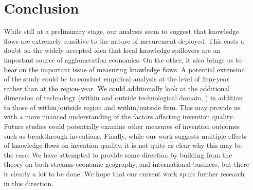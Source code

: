 \documentclass[12pt,letterpaper]{article}
\begin{document}
\section*{Conclusion}
While still at a preliminary stage, our analysis seem to suggest that knowledge flows are extremely sensitive to the nature of mesurement deployed. This casts a doubt on the widely accepted idea that local knowledge spillovers are an important source of agglomeration economies. On the other, it also brings us to bear on the important issue of measuring knowledge flows. A potential extension of the study could be to conduct empirical analysis at the level of firm-year rather than at the region-year. We could additionally look at the additional dimension of technology (within and outside technological domain, \cite{Rosenkopf2001}) in addition to those of within/outside region and within/outside firm. This may provide us with a more nuanced understanding of the factors affecting invention quality. Future studies could potentially examine other measures of invention outcomes such as breakthrough inventions. Finally, while our work suggests multiple effects of knowledge flows on invention quality, it is not quite as clear why this may be the case. We have attempted to provide some direction by building from the theory on both streams economic geography, and international business, but there is clearly a lot to be done. We hope that our current work spurs further research in this direction.  

\renewcommand{\refname}{REFERENCES}
\singlespacing
 

\newpage
\end{document}
